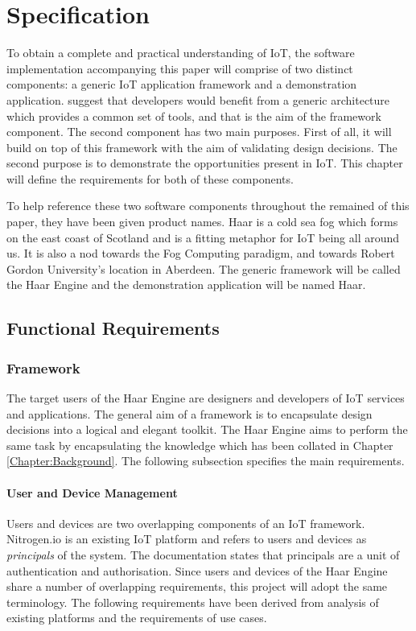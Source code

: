 \chapter{Specification}
\label{Chapter:Specification}
  To obtain a complete and practical understanding of IoT, the software implementation accompanying this paper will comprise of two distinct components: a generic IoT application framework and a demonstration application. \citet{interoperability:2015} suggest that developers would benefit from a generic architecture which provides a common set of tools, and that is the aim of the framework component. The second component has two main purposes. First of all, it will build on top of this framework with the aim of validating design decisions. The second purpose is to demonstrate the opportunities present in IoT. This chapter will define the requirements for both of these components.

  To help reference these two software components throughout the remained of this paper, they have been given product names. Haar is a cold sea fog which forms on the east coast of Scotland and is a fitting metaphor for IoT being all around us. It is also a nod towards the Fog Computing paradigm, and towards Robert Gordon University's location in Aberdeen. The generic framework will be called the Haar Engine and the demonstration application will be named Haar.

  \section{Functional Requirements}
    \subsection{Framework}
      The target users of the Haar Engine are designers and developers of IoT services and applications. The general aim of a framework is to encapsulate design decisions into a logical and elegant toolkit. The Haar Engine aims to perform the same task by encapsulating the knowledge which has been collated in Chapter \ref{Chapter:Background}. The following subsection specifies the main requirements.

      \subsubsection{User and Device Management}
        Users and devices are two overlapping components of an IoT framework. Nitrogen.io is an existing IoT platform and refers to users and devices as \emph{principals} of the system. The documentation states that principals are a unit of authentication and authorisation. Since users and devices of the Haar Engine share a number of overlapping requirements, this project will adopt the same terminology. The following requirements have been derived from analysis of existing platforms and the requirements of use cases.

